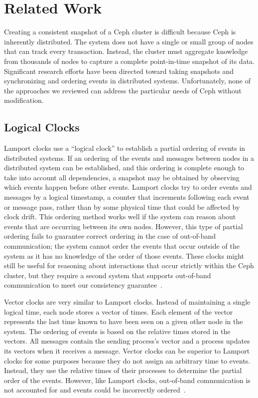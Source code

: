 \chapter{Related Work}
\label{sec:rel-work}

Creating a consistent snapshot of a Ceph cluster is difficult because
Ceph is inherently distributed. The system does not have a single or
small group of nodes that can track every transaction. Instead, the
cluster must aggregate knowledge from thousands of nodes to capture a
complete point-in-time snapshot of its data. Significant research
efforts have been directed toward taking snapshots and synchronizing
and ordering events in distributed systems. Unfortunately, none of the
approaches we reviewed can address the particular needs of Ceph
without modification.

\section{Logical Clocks}

Lamport clocks use a ``logical clock'' to establish a partial ordering
of events in distributed systems. If an ordering of the events and
messages between nodes in a distributed system can be established, and
this ordering is complete enough to take into account all
dependencies, a snapshot may be obtained by observing which events
happen before other events. Lamport clocks try to order events and
messages by a logical timestamp, a counter that increments following
each event or message pass, rather than by some physical time that
could be affected by clock drift. This ordering method works well if
the system can reason about events that are occurring between its own
nodes. However, this type of partial ordering fails to guarantee
correct ordering in the case of out-of-band communication; the system
cannot order the events that occur outside of the system as it has no
knowledge of the order of those events. These clocks might still be
useful for reasoning about interactions that occur strictly within the
Ceph cluster, but they require a second system that supports
out-of-band communication to meet our consistency
guarantee~\citep{Lamport1978}.

Vector clocks are very similar to Lamport clocks. Instead of
maintaining a single logical time, each node stores a vector of
times. Each element of the vector represents the last time known to
have been seen on a given other node in the system. The ordering of
events is based on the relative times stored in the vectors. All
messages contain the sending process's vector and a process
updates its vectors when it receives a message. Vector clocks can be
superior to Lamport clocks for some purposes because they do not assign
an arbitrary time to events. Instead, they use the relative times of
their processes to determine the partial order of the events. However,
like Lamport clocks, out-of-band communication is not accounted for
and events could be incorrectly ordered~\citep{Fidge1988}.

